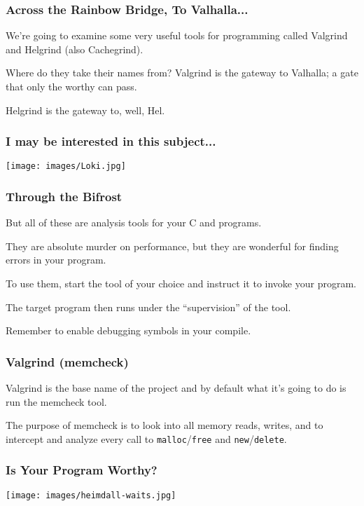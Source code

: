 \begin{frame}
	\frametitle{Across the Rainbow Bridge, To Valhalla...}

	We're going to examine some very useful tools for programming called Valgrind and Helgrind (also Cachegrind).

	Where do they take their names from? Valgrind is the gateway to Valhalla; a gate that only the worthy can pass.

	Helgrind is the gateway to, well, Hel.
\end{frame}


\begin{frame}
	\frametitle{I may be interested in this subject...}

	\begin{center}
		\texttt{[image: images/Loki.jpg]}
	\end{center}

\end{frame}


\begin{frame}
	\frametitle{Through the Bifrost}

	But all of these are analysis tools for your C and \Cpp programs.

	They are absolute murder on performance, but they are wonderful for finding errors in your program.

	To use them, start the tool of your choice and instruct it to invoke your program.

	The target program then runs under the ``supervision'' of the tool.

	Remember to enable debugging symbols in your compile.

\end{frame}

\begin{frame}
	\frametitle{Valgrind (memcheck)}

	Valgrind is the base name of the project and by default what it's going to do is run the memcheck tool.

	The purpose of memcheck is to look into all memory reads, writes, and to intercept and analyze every call to \texttt{malloc}/\texttt{free} and \texttt{new}/\texttt{delete}.

\end{frame}

\begin{frame}
	\frametitle{Is Your Program Worthy?}

	\begin{center}
		\texttt{[image: images/heimdall-waits.jpg]}
	\end{center}

\end{frame}


